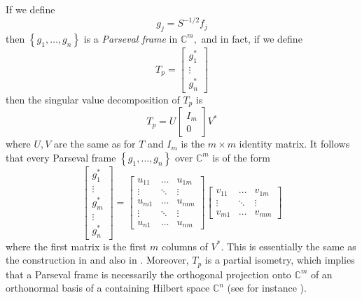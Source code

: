 \documentclass{article}
\begin{document}
If we define 
$$g_{j}=S^{-1/2}f_{j}$$
then $\left\{ g_{1},\ldots ,g_{n}\right\} $ is a \emph{Parseval frame} in $\mathbb{C}^{m},$ and in fact, if we define 
$$
T_{p}=\left[ \begin{array}{c}
               g_{1}^{\ast } \\ 
               \vdots        \\ 
               g_{n}^{\ast }%
            \end{array}
\right] 
$$
then the singular value decomposition of $T_{p}$ is 
$$
T_{p}=U\left[ \begin{array}{c}
                         I_{m} \\ 
                          0
              \end{array}
\right] V^{\ast } 
$$
where $U,V$ are the same as for $T$ and $I_{m}$ is the $m\times m$ identity matrix. It follows that every Parseval frame $\left\{ g_{1},\ldots, g_{n}\right\} $ over $\mathbb{C}^{m}$ is of the form 
$$
\left[ \begin{array}{c}
          g_{1}^{\ast } \\ 
          \vdots        \\ 
          g_{m}^{\ast } \\ 
          \vdots        \\ 
          g_{n}^{\ast }
       \end{array}%
\right] =
\left[ \begin{array}{ccc}
             u_{11} & \ldots  & u_{1m} \\ 
            \vdots  & \ddots  & \vdots \\ 
             u_{m1} & \ldots  & u_{mm} \\ 
            \vdots  & \ddots  & \vdots \\ 
             u_{n1} & \ldots  & u_{nm}
        \end{array}
\right] 
\left[ \begin{array}{ccc}
            v_{11} & \ldots  & v_{1m}  \\ 
           \vdots  & \ddots  & \vdots  \\ 
            v_{m1} & \ldots  & v_{mm}
       \end{array}
\right] 
$$
where the first matrix is the first $m$ columns of $V^{\ast }.$ This is essentially the same as the construction in \cite{casazza2008classes} and also in \cite{casazza2001uniform}.  Moreover, $T_{p}$ is a partial isometry, which implies that a Parseval frame is necessarily the orthogonal projection onto $\mathbb{C}^{m}$ of an orthonormal basis of a containing Hilbert space $\mathbb{C}^{n}$ (see for instance \cite{casazza2007generalization,casazza2013introduction, balan2005excess}).   
\end{document}
